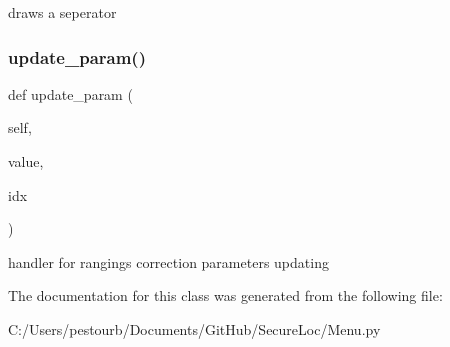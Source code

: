 \begin{DoxyVerb}draws a seperator\end{DoxyVerb}
 \mbox{\label{class_menu_1_1_menu_ac7d46e7da5b790d5efa729c03debbaf1}} 
\subsubsection{\texorpdfstring{update\+\_\+param()}{update\_param()}}
{\footnotesize\ttfamily def update\+\_\+param (\begin{DoxyParamCaption}\item[{}]{self,  }\item[{}]{value,  }\item[{}]{idx }\end{DoxyParamCaption})}

\begin{DoxyVerb}handler for rangings correction parameters updating\end{DoxyVerb}
 

The documentation for this class was generated from the following file\+:\begin{DoxyCompactItemize}
\item 
C\+:/\+Users/pestourb/\+Documents/\+Git\+Hub/\+Secure\+Loc/Menu.\+py\end{DoxyCompactItemize}
